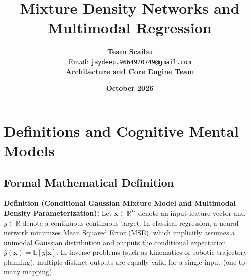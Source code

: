 \documentclass[11pt,a4paper]{article}
\title{\textbf{Mixture Density Networks and Multimodal Regression}}
\author{\textbf{Team Scaibu} \\ \small Email: \texttt{jaydeep.9664920749@gmail.com} \\ \small \textbf{Architecture and Core Engine Team}}
\date{\textbf{October 2026}}
\theoremstyle{definition}
\begin{document}
\maketitle

\section{Definitions and Cognitive Mental Models}

\subsection{Formal Mathematical Definition}
\textbf{Definition (Conditional Gaussian Mixture Model and Multimodal Density Parameterization):}
Let $\mathbf{x} \in \mathbb{R}^D$ denote an input feature vector and $y \in \mathbb{R}$ denote a continuous continuous target. In classical regression, a neural network minimizes Mean Squared Error (MSE), which implicitly assumes a unimodal Gaussian distribution and outputs the conditional expectation $\hat{y}(\mathbf{x}) = \mathbb{E}[y | \mathbf{x}]$. In inverse problems (such as kinematics or robotic trajectory planning), multiple distinct outputs are equally valid for a single input (one-to-many mapping).
\end{document}
